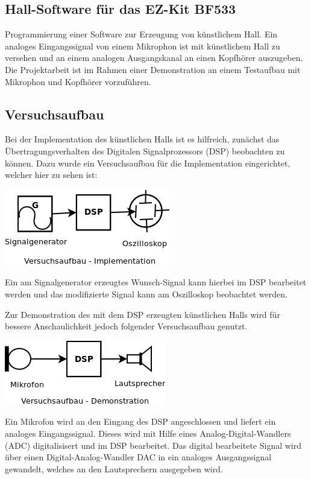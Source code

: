 \documentclass[a4paper,12pt,fontsize=12,DIV=12]{scrartcl}
\begin{document}
\subsection{Hall-Software für das EZ-Kit BF533}
Programmierung einer Software zur Erzeugung von künstlichem Hall. Ein analoges Eingangssignal von einem Mikrophon ist mit künstlichem Hall zu versehen und an einem analogen Ausgangskanal an einen Kopfhörer auszugeben.
\newline
Die Projektarbeit ist im Rahmen einer Demonstration an einem Testaufbau mit Mikrophon und Kopfhörer vorzuführen.

\subsection{Versuchsaufbau}
Bei der Implementation des künstlichen Halls ist es hilfreich, zunächst das Übertragungsverhalten des Digitalen Signalprozessors (DSP) beobachten zu können. Dazu wurde ein Versuchsaufbau für die Implementation eingerichtet, welcher hier zu sehen ist:
\begin{center}
\includegraphics[scale=0.8]{Bilder/Versuchsaufbau_Implementation.png}
\end{center}
Ein am Signalgenerator erzeugtes Wunsch-Signal kann hierbei im DSP bearbeitet werden und das modifizierte Signal kann am Oszilloskop beobachtet werden.

Zur Demonstration des mit dem DSP erzeugten künstlichen Halls wird für bessere Anschaulichkeit jedoch folgender Versuchsaufbau genutzt.
\begin{center}
	\includegraphics[scale=0.8]{Bilder/Versuchsaufbau_Demonstration.png}
\end{center}
%
%
Ein Mikrofon wird an den Eingang des DSP angeschlossen und liefert ein analoges Eingangssignal. Dieses wird mit Hilfe eines Analog-Digital-Wandlers (ADC) digitalisisert und im DSP bearbeitet. Das digital bearbeitete Signal wird über einen Digital-Analog-Wandler DAC in ein analoges Ausgangssignal gewandelt, welches an den Lautsprechern ausgegeben wird.
\end{document}
